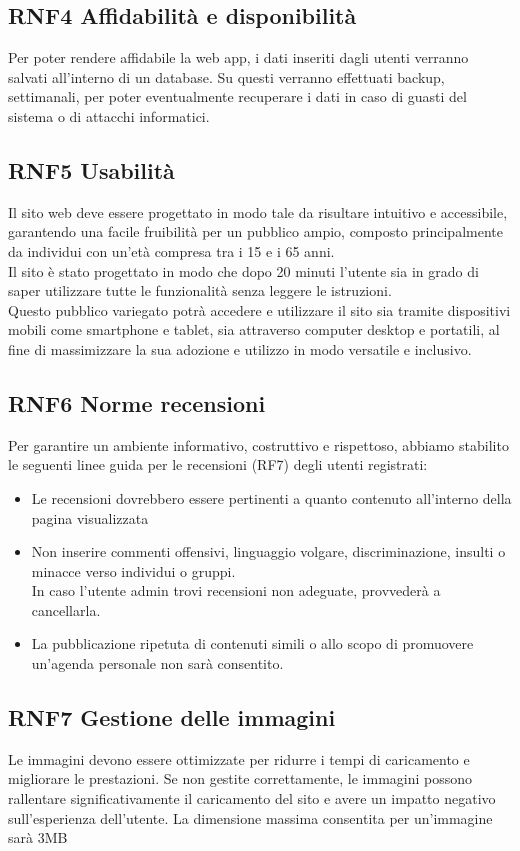 \documentclass[a4paper,12pt]{article}
\begin{document}
\subsection*{RNF4 Affidabilità e disponibilità}
Per poter rendere affidabile la web app, i dati inseriti dagli utenti verranno salvati all’interno di un database. Su questi verranno effettuati backup, settimanali, per poter eventualmente recuperare i dati in caso di guasti del sistema o di attacchi informatici.


\subsection*{RNF5 Usabilità}
Il sito web deve essere progettato in modo tale da risultare intuitivo e accessibile, garantendo una facile fruibilità per un pubblico ampio, composto principalmente da individui con un'età compresa tra i 15 e i 65 anni.\\
Il sito è stato progettato in modo che dopo 20 minuti l'utente sia in grado di saper utilizzare tutte le funzionalità senza leggere le istruzioni.\\
Questo pubblico variegato potrà accedere e utilizzare il sito sia tramite dispositivi mobili come smartphone e tablet, sia attraverso computer desktop e portatili, al fine di massimizzare la sua adozione e utilizzo in modo versatile e inclusivo.


\subsection*{RNF6 Norme recensioni}
Per garantire un ambiente informativo, costruttivo e rispettoso, abbiamo stabilito le seguenti linee guida per le recensioni (RF7) degli utenti registrati:
\begin{itemize}
    \item Le recensioni dovrebbero essere pertinenti a quanto contenuto all'interno della pagina visualizzata
    \item Non inserire commenti offensivi, linguaggio volgare, discriminazione, insulti o minacce verso individui o gruppi.\\
    In caso l'utente admin trovi recensioni non adeguate, provvederà a cancellarla.
    \item La pubblicazione ripetuta di contenuti simili o allo scopo di promuovere un'agenda personale non sarà consentito.
\end{itemize}

\subsection*{RNF7 Gestione delle immagini}
Le immagini devono essere ottimizzate per ridurre i tempi di caricamento e migliorare le prestazioni. Se non gestite correttamente, le immagini possono rallentare significativamente il caricamento del sito e avere un impatto negativo sull'esperienza dell'utente.
La dimensione massima consentita per un'immagine sarà 3MB
\end{document}
